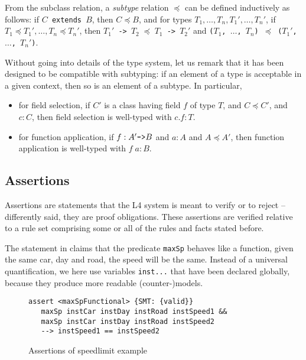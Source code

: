 From the subclass relation, a \emph{subtype} relation $\preceq$ can be defined
inductively as follows: if \texttt{$C$ extends $B$}, then $C \preceq B$, and
for types $T_1, \dots, T_n, T_1', \dots, T_n'$,
if $T_1 \preceq T_1', \dots, T_n \preceq T_n'$, 
then \texttt{$T_1'$ -> $T_2 \; \preceq \; T_1$ -> $T_2'$} 
and \texttt{($T_1$, $\dots$, $T_n$) $\preceq$ ($T_1'$, $\dots$, $T_n'$)}.

Without going into details of the type system, let us remark that it has been
designed to be compatible with subtyping: if an element of a type is
acceptable in a given context, then so is an element of a subtype. In
particular,
\begin{itemize}
\item for field selection, if $C'$ is a class having field $f$ of type $T$,
  and $C \preceq C'$, and $c : C$, then field selection is well-typed with $c.f : T$.
\item for function application, if $f: A' \mbox{\texttt{->}} B$ and $a:A$ and
  $A \preceq A'$, then function application is well-typed with $f\; a : B$.
\end{itemize}



\subsection{Assertions}\label{sec:assertions}


Assertions are statements that the L4 system is meant to verify or to
reject -- differently said, they are proof obligations. These assertions are verified
relative to a rule set comprising some or all of the rules and facts stated
before. 

The statement in  claims that the predicate
\texttt{maxSp} behaves like a function, \ie{} given the same car, day and
road, the speed will be the same. Instead of a universal quantification, we
here use variables \texttt{inst...} that have been declared globally, because they
produce more readable (counter-)models. 

\begin{figure}[h]

\begin{lstlisting}
assert <maxSpFunctional> {SMT: {valid}}
   maxSp instCar instDay instRoad instSpeed1 &&
   maxSp instCar instDay instRoad instSpeed2
   --> instSpeed1 == instSpeed2
\end{lstlisting}

  \caption{Assertions of speedlimit example}\label{fig:assertions}
\end{figure}

